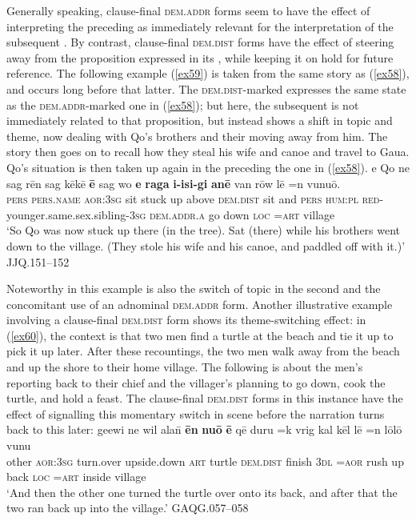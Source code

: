 \documentclass[output=paper
,modfonts
,nonflat]{langsci/langscibook}
\begin{document}
\noindent
Generally speaking, clause-final \textsc{dem.addr} forms seem to have the effect of interpreting the preceding  as immediately relevant for the interpretation of the subsequent . By contrast, clause-final \textsc{dem.dist} forms have the effect of steering away from the proposition expressed in its , while keeping it on hold for future reference. The following example (\ref{ex59}) is taken from the same story as (\ref{ex58}), and occurs long before that latter. The \textsc{dem.dist}-marked  expresses the same state as the \textsc{dem.addr}-marked one in (\ref{ex58}); but here, the subsequent  is not immediately related to that proposition, but instead shows a shift in topic and theme, now dealing with Qo{\textquotesingle}'s brothers and their moving away from him. The story then goes on to recall how they steal his wife and canoe and travel to Gaua. Qo{\textquotesingle}'s situation is then taken up again in the  preceding the one in (\ref{ex58}).
\ea	\label{ex59}
\gll		e 		Qo{\textquotesingle} 	ne 		sag 	r\=en 		sag 	k\=ek\=e 		\textbf{\=e}		sag 	wo 	\textbf{e}		\textbf{raga} 		\textbf{{\textquotesingle}i-{\textquotesingle}isi-gi} 	\textbf{an\=e} 		van 	r\=ow 	l\=e		=n 		vunu\=o.		\\
\textsc{pers}	\textsc{pers.name}	\textsc{aor:3sg}	sit		stuck		up		above		\textsc{dem.dist}		sit		and	\textsc{pers}	\textsc{hum:pl}	\textsc{red-}younger.same.sex.sibling-\textsc{3sg}	\textsc{dem.addr.a}	go		down		\textsc{loc}	\textsc{=art}	village		\\
\glt	`So Qo{\textquotesingle} was now stuck up there (in the tree). Sat (there) while his brothers went down to the village. (They stole his wife and his canoe, and paddled off with it.)'	\hfill{JJQ.151--152}
\z

\noindent
Noteworthy in this example is also the switch of topic in the second  and the concomitant use of an adnominal \textsc{dem.addr} form. Another illustrative example involving a clause-final \textsc{dem.dist} form shows its theme-switching effect: in (\ref{ex60}), the context is that two men find a turtle at the beach and tie it up to pick it up later. After these recountings, the two men walk away from the beach and up the shore to their home village. The following  is about the men's reporting back to their chief and the villager's planning to go down, cook the turtle, and hold a feast. The clause-final \textsc{dem.dist} forms in this instance have the effect of signalling this momentary switch in scene before the narration turns back to this  later:
\ea	\label{ex60}
\gll		ge{\textquotesingle}ew{\textquotesingle}i 	ne 		wil 			{\textquotesingle}ala\=n 	\textbf{\=en} \textbf{nu\=o} 		\textbf{\=e}			q\=e{\textquotesingle}	duru	=k	vrig	kal	k\=el	l\=e		=n	l\=ol\=o		vunu		\\
other		\textsc{aor:3sg}	turn.over		upside.down	\textsc{art}	turtle		\textsc{dem.dist}		finish		\textsc{3dl}	\textsc{=aor}	rush	up		back	\textsc{loc}	\textsc{=art}	inside		village		\\
\glt	`And then the other one turned the turtle over onto its back, and after that the two ran back up into the village.'		\hfill{GAQG.057--058}
\z
\end{document}
